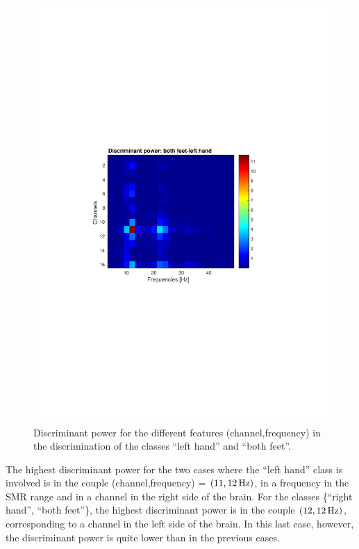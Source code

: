 \begin{figure}[h!]
   \centering
   \includegraphics[width = \textwidth]{images/DP_LHBF.pdf}
   \caption{Discriminant power for the different features (channel,frequency) in the discrimination of the classes ``left hand'' and ``both feet''.}
   \label{fig:DP_LHBF}
\end{figure}
The highest discriminant power for the two cases where the ``left hand'' class is involved is in the couple (channel,frequency) = $(11,\unit[12]{Hz})$, in a frequency in the SMR range and in a channel in the right side of the brain.
For the classes \{``right hand'', ``both feet''\}, the highest discriminant power is in the couple $(12,\unit[12]{Hz})$, corresponding to a channel in the left side of the brain.
In this last case, however, the discriminant power is quite lower than in the previous cases.

